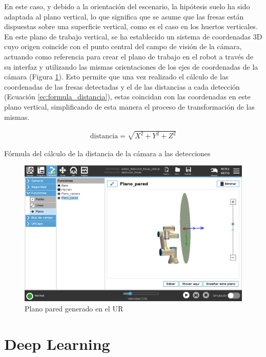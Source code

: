 En este caso, y debido a la orientación del escenario, la hipótesis suelo ha sido adaptada al plano vertical, lo que significa que se asume que las fresas están dispuestas sobre una superficie vertical, como es el caso en los huertos verticales. En este plano de trabajo vertical, se ha establecido un sistema de coordenadas 3D cuyo origen coincide con el punto central del campo de visión de la cámara, actuando como referencia para crear el plano de trabajo en el robot a través de su interfaz y utilizando las mismas orientaciones de los ejes de coordenadas de la cámara (Figura \ref{fig:Plano_pared_UR}). Esto permite que una vez realizado el cálculo de las coordenadas de las fresas detectadas y el de las distancias a cada detección (Ecuación \ref{ec:formula_distancia}), estas coincidan con las coordenadas en este plano vertical, simplificando de esta manera el proceso de transformación de las mismas. 

\begin{myequation}[H]
  \begin{align}
    \text{distancia} = \sqrt{X^2 + Y^2 + Z^2}
  \nonumber
  \end{align}
\caption{Fórmula del cálculo de la distancia de la cámara a las detecciones}
\label{ec:formula_distancia}
\end{myequation}


\begin{figure} [H]
    \begin{center}
      \includegraphics[width=14cm]{figs/Plano Pared Programa UR.png}
    \end{center}
    \caption{Plano pared generado en el UR}
    \label{fig:Plano_pared_UR}
\end{figure}


\section{Deep Learning}
\label{sec:Tecnica_Vision}

